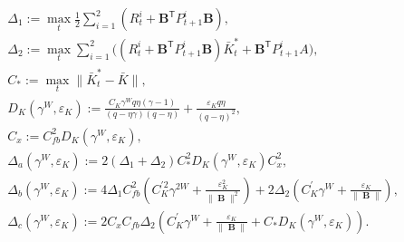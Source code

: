 \documentclass[letterpaper, 10 pt, conference]{ieeeconf}  %
\newcommand{\transpose}{\mathsf{T}}
\DeclareMathOperator{\contB}{\mathbf{B}}
\begin{document}
\begin{align*}
    &\Delta_{1} := \max_{t} \frac{1}{2}\sum_{i=1}^{2}(R_{t}^{i}+\mathbf{B}^{\transpose}P_{t+1}^{i}\mathbf{B}),\\
    &\Delta_{2} := \max_{t} \sum_{i=1}^{2}\bigg( (R_{t}^{i}+\mathbf{B}^{\transpose}P_{t+1}^{i}\mathbf{B})\bar{K}_{t}^{*}+\mathbf{B}^{\transpose}P_{t+1}^{i}A\bigg),\\
    &C_{*} := \max_{t} \|\bar{K}_{t}^{*}-\bar{K}\|,\\
    &D_{K}(\gamma^{W},\varepsilon_{K}) := \frac{C_{K}\gamma^{W}q\eta(\gamma-1)}{(q-\eta\gamma)(q-\eta)} + \frac{\varepsilon_{K}q\eta}{(q-\eta)^{2}},\\
    &C_{x} := C_{fb}^{2}D_{K}(\gamma^{W},\varepsilon_{K}),\\
    &\Delta_{a}(\gamma^{W},\varepsilon_{K}) := 2(\Delta_{1}+\Delta_{2})C_{*}^{2}D_{K}(\gamma^{W},\varepsilon_{K})C_{x}^{2},\\
    &\Delta_{b}(\gamma^{W},\varepsilon_{K}) := 4\Delta_{1}C_{fb}^{2}(C_{K}^{'2}\gamma^{2W}+\frac{\varepsilon_{K}^{2}}{\|\contB\|^{2}} )+2\Delta_{2}(C_{K}^{'}\gamma^{W}+\frac{\varepsilon_{K}}{\|\contB\|}),\\
    &\Delta_{c}(\gamma^{W},\varepsilon_{K}) := 2C_{x}C_{fb}\Delta_{2}(C_{K}^{'}\gamma^{W}+\frac{\varepsilon_{K}}{\|\contB\|}+C_{*}D_{K}(\gamma^{W},\varepsilon_{K})).
\end{align*}
\end{document}
